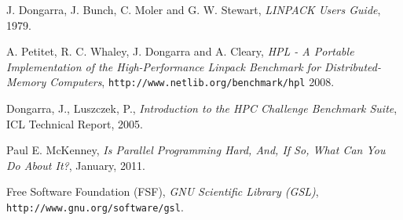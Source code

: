 \documentclass[a4paper]{report}
\begin{document}
\begin{thebibliography}{9}
  J. Dongarra, J. Bunch, C. Moler and G. W. Stewart, 
  \emph{LINPACK Users Guide},
  1979.
  
  A. Petitet, R. C. Whaley, J. Dongarra and A. Cleary, 
  \emph{HPL - A Portable Implementation of the High-Performance Linpack
    Benchmark for Distributed-Memory Computers}, {\tt http://www.netlib.org/benchmark/hpl}
  2008.

  Dongarra, J., Luszczek, P.,
  \emph{Introduction to the HPC Challenge Benchmark Suite}, ICL Technical Report,
  2005.  
  
  Paul E. McKenney,
  \emph{Is Parallel Programming Hard, And, If So, What Can You Do About It?},
  January, 2011.

  Free Software Foundation (FSF), \emph{GNU Scientific Library (GSL)},
  {\tt http://www.gnu.org/software/gsl}.

\end{thebibliography}
\end{document}
